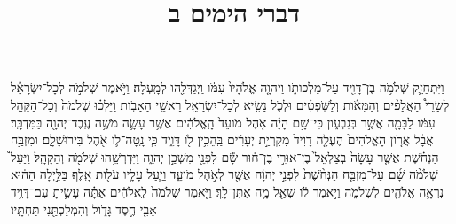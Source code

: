 \documentclass{openreader}
\title{דברי הימים ב}
\date{}
\begin{document}
\maketitle
\raggedbottom 
\fontsize{16pt}{24pt}\selectfont


וַיִּתְחַזֵּ֛ק שְׁלֹמֹ֥ה בֶן־דָּוִ֖יד עַל־מַלְכוּתֹ֑ו וַיהוָ֤ה אֱלֹהָיו֙ עִמֹּ֔ו וַֽיְגַדְּלֵ֖הוּ לְמָֽעְלָה׃ 
וַיֹּ֣אמֶר שְׁלֹמֹ֣ה לְכָל־יִשְׂרָאֵ֡ל לְשָׂרֵי֩ הָאֲלָפִ֨ים וְהַמֵּאֹ֜ות וְלַשֹּֽׁפְטִ֗ים וּלְכֹ֛ל נָשִׂ֥יא לְכָל־יִשְׂרָאֵ֖ל רָאשֵׁ֥י הָאָבֹֽות׃ 
וַיֵּלְכ֗וּ שְׁלֹמֹה֙ וְכָל־הַקָּהָ֣ל עִמֹּ֔ו לַבָּמָ֖ה אֲשֶׁ֣ר בְּגִבְעֹ֑ון כִּי־שָׁ֣ם הָיָ֗ה אֹ֤הֶל מֹועֵד֙ הָֽאֱלֹהִ֔ים אֲשֶׁ֥ר עָשָׂ֛ה מֹשֶׁ֥ה עֶֽבֶד־יְהוָ֖ה בַּמִּדְבָּֽר׃ 
אֲבָ֗ל אֲרֹ֤ון הָאֱלֹהִים֙ הֶעֱלָ֤ה דָוִיד֙ מִקִּרְיַ֣ת יְעָרִ֔ים בַּֽהֵכִ֥ין לֹ֖ו דָּוִ֑יד כִּ֧י נָֽטָה־לֹ֛ו אֹ֖הֶל בִּירוּשָׁלִָֽם׃ 
וּמִזְבַּ֣ח הַנְּחֹ֗שֶׁת אֲשֶׁ֤ר עָשָׂה֙ בְּצַלְאֵל֙ בֶּן־אוּרִ֣י בֶן־ח֔וּר שָׂ֕ם לִפְנֵ֖י מִשְׁכַּ֣ן יְהוָ֑ה וַיִּדְרְשֵׁ֥הוּ שְׁלֹמֹ֖ה וְהַקָּהָֽל׃ 
וַיַּעַל֩ שְׁלֹמֹ֨ה שָׁ֜ם עַל־מִזְבַּ֤ח הַנְּחֹ֨שֶׁת֙ לִפְנֵ֣י יְהוָ֔ה אֲשֶׁ֖ר לְאֹ֣הֶל מֹועֵ֑ד וַיַּ֧עַל עָלָ֛יו עֹלֹ֖ות אָֽלֶף׃ 
בַּלַּ֣יְלָה הַה֔וּא נִרְאָ֥ה אֱלֹהִ֖ים לִשְׁלֹמֹ֑ה וַיֹּ֣אמֶר לֹ֔ו שְׁאַ֖ל מָ֥ה אֶתֶּן־לָֽךְ׃ 
וַיֹּ֤אמֶר שְׁלֹמֹה֙ לֵֽאלֹהִ֔ים אַתָּ֗ה עָשִׂ֛יתָ עִם־דָּוִ֥יד אָבִ֖י חֶ֣סֶד גָּדֹ֑ול וְהִמְלַכְתַּ֖נִי תַּחְתָּֽיו׃ 
\end{document}
